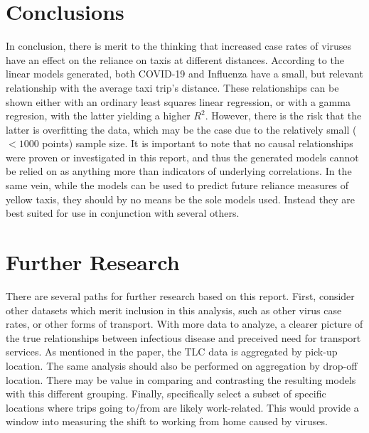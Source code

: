 \documentclass[11pt]{article}
\begin{document}

\section{Conclusions}

In conclusion, there is merit to the thinking that increased case rates of viruses 
have an effect on the reliance on taxis at different distances.
According to the linear models generated, 
both COVID-19 and Influenza have a small, but relevant relationship with the average taxi trip's distance.
These relationships can be shown either with an ordinary least squares linear regression,
or with a gamma regresion, with the latter yielding a higher $R^2$.
However, there is the risk that the latter is overfitting the data,
which may be the case due to the relatively small ($< 1000$ points) sample size.
It is important to note that no causal relationships were proven or investigated in this report,
and thus the generated models cannot be relied on as anything more than indicators
of underlying correlations. In the same vein, 
while the models can be used to predict future reliance measures of yellow taxis,
they should by no means be the sole models used. 
Instead they are best suited for use in conjunction with several others.



\section{Further Research}
There are several paths for further research based on this report.
First, consider other datasets which merit inclusion
in this analysis, such as other virus case rates, or other forms of transport.
With more data to analyze, a clearer picture of the true relationships between infectious disease and preceived need for transport services.
As mentioned in the paper, the TLC data is aggregated by pick-up location.
    The same analysis should also be performed on aggregation by drop-off location.
    There may be value in comparing and contrasting the resulting models with this different grouping.
Finally, specifically select a subset of specific locations where trips going to/from are likely work-related. 
This would provide a window into measuring the shift to working from home caused by viruses.


\clearpage

\printbibliography
\end{document}
